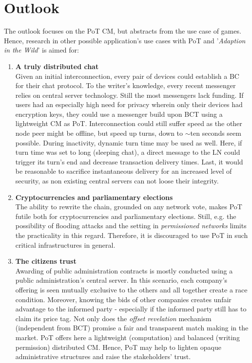 \pagebreak



\section{Outlook}
\label{sec:Outlook}

The outlook focuses on the \gls{PoT} \gls{CM}, but abstracts from the use case of games.
Hence, research in other possible application's use cases with \gls{PoT}
and '\textit{Adaption in the Wild}' is aimed for:
\begin{enumerate}
	\item \textbf{A truly distributed chat} \\
	Given an initial interconnection, every pair of devices could establish a \gls{BC} for their chat protocol.
	To the writer's knowledge, every recent messenger relies on central server technology.
	Still the most messengers lack funding.
	If users had an especially high need for privacy wherein only their devices had encryption keys, 
	they could use a messenger build upon \gls{BCT} using a lightweight \gls{CM} as \gls{PoT}.
	Interconnection could still suffer speed as the other node peer might be offline,
	but speed up turns, down to $\sim$ten seconds seem possible.
	During inactivity, dynamic turn time may be used as well.
	Here, if turn time was set to long (sleeping chat),
	a direct message to the \gls{LN} could trigger its turn's end and decrease transaction delivery times.
	Last, it would be reasonable to sacrifice instantaneous delivery for an increased level of security,
	as non existing central servers can not loose their integrity.
	
	\item \textbf{Cryptocurrencies and parliamentary elections} \\
	The ability to rewrite the chain, grounded on any network vote,
	makes \gls{PoT} futile both for cryptocurrencies and parliamentary elections.
	Still, e.g. the possibility of flooding attacks and the setting in \textit{permissioned networks}
	limits the practicality in this regard.
	Therefore, it is discouraged to use \gls{PoT} in such critical infrastructures in general.
	
	\item \textbf{The citizens trust} \\
	Awarding of public administration contracts is mostly conducted using a public administration's central server.
	In this scenario, each company's offering is seen mutually exclusive to the others and all together create a race condition.
	Moreover, knowing the bids of other companies creates unfair advantage to the informed
	party - especially if the informed party still has to claim its price tag.
	Not only does the \textit{offset revelation} mechanism (independent from \gls{BCT})
	promise a fair and transparent match making in the market.
	\gls{PoT} offers here a lightweight (computation) and balanced (writing permission) distributed \gls{CM}.
	Hence, \gls{PoT} may help to lighten opaque administrative structures and raise the stakeholders' trust.
	

\end{enumerate}

